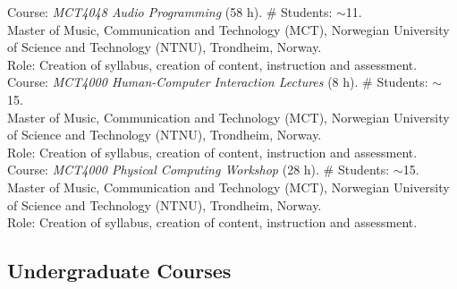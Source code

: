 \documentclass[10pt, a4paper]{article}
\newcommand{\years}[1]{\marginnote{\scriptsize #1}}
\begin{document}
{{\years{1/2019}Course: \emph{MCT4048 Audio Programming} (58 h). \# Students: $\sim$11. \\
Master of Music, Communication and Technology (MCT), Norwegian University of Science and Technology (NTNU), Trondheim, Norway.\\ 
Role: Creation of syllabus, creation of content, instruction and assessment.\\
\years{10/2018}Course: \emph{MCT4000 Human-Computer Interaction Lectures} (8 h). \# Students: $\sim$15. \\
Master of Music, Communication and Technology (MCT), Norwegian University of Science and Technology (NTNU), Trondheim, Norway.\\ 
Role: Creation of syllabus, creation of content, instruction and assessment.\\
\years{10/2018}Course: \emph{MCT4000 Physical Computing Workshop} (28 h). \# Students: $\sim$15. \\
Master of Music, Communication and Technology (MCT), Norwegian University of Science and Technology (NTNU), Trondheim, Norway.\\ 
Role: Creation of syllabus, creation of content, instruction and assessment.


\subsection*{Undergraduate Courses}
\noindent

}}
\end{document}
